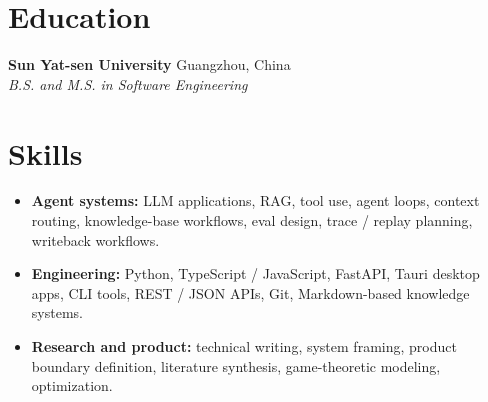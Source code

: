 \documentclass[10pt,letterpaper]{article}
\newcommand{\resumeItem}[1]{\item #1}
\newcommand{\resumeSubheading}[4]{
  \textbf{#1} \hfill #2 \\
  \textit{#3} \hfill \textit{#4}
}
\begin{document}
\section{Education}

\resumeSubheading{Sun Yat-sen University}{Guangzhou, China}
{B.S. and M.S. in Software Engineering}{}

\section{Skills}
\begin{itemize}
  \resumeItem{\textbf{Agent systems:} LLM applications, RAG, tool use, agent loops, context routing, knowledge-base workflows, eval design, trace / replay planning, writeback workflows.}
  \resumeItem{\textbf{Engineering:} Python, TypeScript / JavaScript, FastAPI, Tauri desktop apps, CLI tools, REST / JSON APIs, Git, Markdown-based knowledge systems.}
  \resumeItem{\textbf{Research and product:} technical writing, system framing, product boundary definition, literature synthesis, game-theoretic modeling, optimization.}
\end{itemize}
\end{document}
